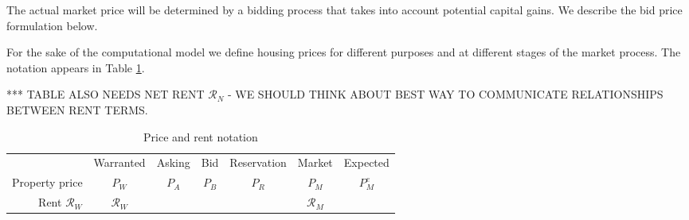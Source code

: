 The actual market price will be determined by a bidding process that takes into account potential capital gains.  We describe the bid price formulation below. %

For the sake of the computational model we define housing prices for different purposes and at different stages of the market process. The notation appears in Table \ref{table-price-notation}.

*** TABLE ALSO NEEDS NET RENT $\mathcal{R}_N$ - WE SHOULD THINK ABOUT BEST WAY TO COMMUNICATE RELATIONSHIPS BETWEEN RENT TERMS.
\begin{table}[]
\centering
\begin{tabular}{r|c|c|c|c|c|c|}\cline{2-7}
                     & Warranted       & Asking  & Bid  & Reservation & Market          & Expected \\ \cline{2-7}
Property price       & $P_W$           & $P_A$  & $P_B$ & $P_R$       & $P_M$           & $P_M^e$  \\ \cline{2-7}
Rent $\mathcal{R}_W$ & $\mathcal{R}_W$ &        &       &             & $\mathcal{R}_M$ &          \\ \cline{2-7}
\end{tabular}
\caption{Price and rent notation}
\label{table-price-notation}
\end{table}



